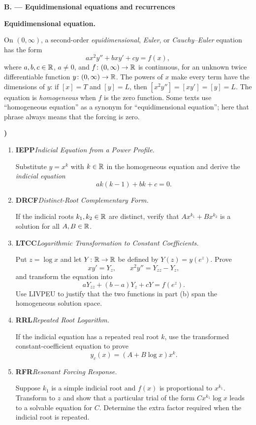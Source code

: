 \documentclass[10pt,a4paper]{article}
\newcounter{examquestion}
\newcommand{\examquestion}[1]{%
  \Needspace{5\baselineskip}%
  \refstepcounter{examquestion}%
  \par\addvspace{0.8\baselineskip}%
  \noindent\textbf{\theexamquestion)}\enspace #1\par
}
\newenvironment{subquestions}
  {\begin{enumerate}[label=\alph*),leftmargin=2.1em]}
  {\end{enumerate}}
\newcommand{\nameditem}[2]{%
  \textbf{\textsf{#1}}\enspace\emph{#2.}\enspace
}
\newcommand{\concept}[1]{%
  \par\addvspace{0.55\baselineskip}\noindent\textbf{#1.}\enspace
}
\newcommand{\subpart}[1]{%
  \begin{center}
    \textbf{#1}
  \end{center}
}
\begin{document}
\subpart{B. --- Equidimensional equations and recurrences}

\concept{Equidimensional equation}
On $(0,\infty)$, a second-order \emph{equidimensional}, \emph{Euler}, or
\emph{Cauchy--Euler} equation has the form
\[
  ax^2y''+bxy'+cy=f(x),
\]
where $a,b,c\in\mathbb{R}$, $a\ne0$, and $f\colon(0,\infty)\to\mathbb{R}$ is
continuous, for an unknown twice differentiable function
$y\colon(0,\infty)\to\mathbb{R}$.  The powers of $x$ make every term have the
dimensions of $y$: if $[x]=T$ and $[y]=L$, then
$[x^2y'']=[xy']=[y]=L$.
The equation is \emph{homogeneous} when $f$ is the zero function.  Some
texts use ``homogeneous equation'' as a synonym for ``equidimensional
equation''; here that phrase always means that the forcing is zero.

\examquestion{\label{q:equidimensional}
\begin{subquestions}
  \item \nameditem{IEPP}{Indicial Equation from a Power Profile}
  Substitute $y=x^k$ with $k\in\mathbb{R}$ in the homogeneous equation and derive
  the \emph{indicial equation}
  \[
    ak(k-1)+bk+c=0.
  \]

  \item \nameditem{DRCF}{Distinct-Root Complementary Form}
  If the indicial roots $k_1,k_2\in\mathbb{R}$ are distinct, verify that
  $Ax^{k_1}+Bx^{k_2}$ is a solution for all $A,B\in\mathbb{R}$.

  \item \nameditem{LTCC}{Logarithmic Transformation to Constant Coefficients}
  Put $z=\log x$ and let $Y\colon\mathbb{R}\to\mathbb{R}$ be defined by $Y(z)=y(e^z)$.  Prove
  \[
    xy'=Y_z,\qquad x^2y''=Y_{zz}-Y_z,
  \]
  and transform the equation into
  \[
    aY_{zz}+(b-a)Y_z+cY=f(e^z).
  \]
  Use LIVPEU to justify that the two functions in part (b) span the
  homogeneous solution space.

  \item \nameditem{RRL}{Repeated Root Logarithm}
  If the indicial equation has a repeated real root $k$, use the transformed
  constant-coefficient equation to prove
  \[
    y_c(x)=(A+B\log x)x^k.
  \]

  \item \nameditem{RFR}{Resonant Forcing Response}
  Suppose $k_1$ is a simple indicial root and $f(x)$ is proportional to
  $x^{k_1}$.  Transform to $z$ and show that a particular trial of the form
  $Cx^{k_1}\log x$ leads to a solvable equation for $C$.  Determine the
  extra factor required when the indicial root is repeated.
\end{subquestions}}
\end{document}
